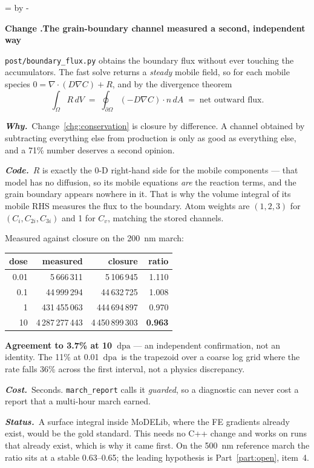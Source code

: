 \documentclass[11pt,a4paper]{article}
\newcommand{\code}[1]{\texttt{\small #1}}
\newcommand{\dpa}{\ensuremath{\mathrm{dpa}}}
\newcommand{\needlines}[1]{%
  \par\dimen0=\pagegoal \advance\dimen0 by -\pagetotal
  \ifdim\dimen0<#1\baselineskip \newpage \fi}
\newcounter{chg}
\newcommand{\change}[1]{%
  \needlines{4}%
  \refstepcounter{chg}%
  \par\medskip\noindent
  {\bfseries\boldmath Change \thechg.\quad #1}%
  \par\nobreak\smallskip}
\newcommand{\why}[1]{\par\noindent\textbf{\itshape Why.}\ #1\par}
\newcommand{\impact}[1]{\par\noindent\textbf{\itshape Code.}\ #1\par}
\newcommand{\cost}[1]{\par\noindent\textbf{\itshape Cost.}\ #1\par}
\newcommand{\status}[1]{\par\noindent\textbf{\itshape Status.}\ #1\par}
\begin{document}
\change{The grain-boundary channel measured a second, independent way}
\label{chg:boundaryflux}
\code{post/boundary\_flux.py} obtains the boundary flux without ever touching
the accumulators. The fast solve returns a \emph{steady} mobile field, so for
each mobile species $0 = \nabla\cdot(D\nabla C) + R$, and by the divergence
theorem
\[
  \int_\Omega R \,dV \;=\; \oint_{\partial\Omega} (-D\nabla C)\cdot n \,dA
  \;=\; \text{net outward flux}.
\]
\why{Change~\ref{chg:conservation} is closure by difference. A channel obtained
by subtracting everything else from production is only as good as everything
else, and a 71\% number deserves a second opinion.}
\impact{$R$ is exactly the 0-D right-hand side for the mobile components ---
that model has no diffusion, so its mobile equations \emph{are} the reaction
terms, and the grain boundary appears nowhere in it. That is why the volume
integral of its mobile RHS measures the flux to the boundary. Atom weights are
$(1,2,3)$ for $(C_i, C_{2i}, C_{3i})$ and 1 for $C_v$, matching the stored
channels.

Measured against closure on the 200~nm march:

\begin{center}
\begin{tabular}{rrrr}
\toprule
dose & measured & closure & ratio \\
\midrule
0.01 & 5\,666\,311 & 5\,106\,945 & 1.110 \\
0.1  & 44\,999\,294 & 44\,632\,725 & 1.008 \\
1    & 431\,455\,063 & 444\,694\,897 & 0.970 \\
10   & 4\,287\,277\,443 & 4\,450\,899\,303 & \textbf{0.963} \\
\bottomrule
\end{tabular}
\end{center}

\noindent
\textbf{Agreement to 3.7\% at 10~\dpa} --- an independent confirmation, not an
identity. The 11\% at 0.01~\dpa\ is the trapezoid over a coarse log grid where
the rate falls 36\% across the first interval, not a physics discrepancy.}
\cost{Seconds. \code{march\_report} calls it \emph{guarded}, so a diagnostic
can never cost a report that a multi-hour march earned.}
\status{A surface integral inside MoDELib, where the FE gradients already
exist, would be the gold standard. This needs no C++ change and works on runs
that already exist, which is why it came first. On the 500~nm reference march
the ratio sits at a stable 0.63--0.65; the leading hypothesis is
Part~\ref{part:open}, item~4.}
\end{document}
